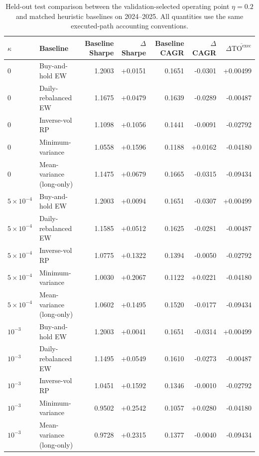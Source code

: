\documentclass[10pt,twocolumn]{article}
\newcommand{\TOexec}{\mathrm{TO}^{\mathrm{exec}}}
\newcommand{\kappaTC}{\kappa}
\begin{document}
\begin{table}[t]
\centering
\scriptsize
\caption{Held-out test comparison between the validation-selected operating point $\eta=0.2$ and matched heuristic baselines on 2024--2025. All quantities use the same executed-path accounting conventions.}
\label{tab:selected_vs_external}
\begin{tabular}{@{}llrrrrr@{}}
\toprule
$\kappaTC$ & Baseline & Baseline Sharpe & $\Delta$Sharpe & Baseline CAGR & $\Delta$CAGR & $\Delta\overline{\TOexec}$ \\
\midrule
$0$ & Buy-and-hold EW & 1.2003 & +0.0151 & 0.1651 & -0.0301 & +0.00499 \\
$0$ & Daily-rebalanced EW & 1.1675 & +0.0479 & 0.1639 & -0.0289 & -0.00487 \\
$0$ & Inverse-vol RP & 1.1098 & +0.1056 & 0.1441 & -0.0091 & -0.02792 \\
$0$ & Minimum-variance & 1.0558 & +0.1596 & 0.1188 & +0.0162 & -0.04180 \\
$0$ & Mean-variance (long-only) & 1.1475 & +0.0679 & 0.1665 & -0.0315 & -0.09434 \\
$5\times10^{-4}$ & Buy-and-hold EW & 1.2003 & +0.0094 & 0.1651 & -0.0307 & +0.00499 \\
$5\times10^{-4}$ & Daily-rebalanced EW & 1.1585 & +0.0512 & 0.1625 & -0.0281 & -0.00487 \\
$5\times10^{-4}$ & Inverse-vol RP & 1.0775 & +0.1322 & 0.1394 & -0.0050 & -0.02792 \\
$5\times10^{-4}$ & Minimum-variance & 1.0030 & +0.2067 & 0.1122 & +0.0221 & -0.04180 \\
$5\times10^{-4}$ & Mean-variance (long-only) & 1.0602 & +0.1495 & 0.1520 & -0.0177 & -0.09434 \\
$10^{-3}$ & Buy-and-hold EW & 1.2003 & +0.0041 & 0.1651 & -0.0314 & +0.00499 \\
$10^{-3}$ & Daily-rebalanced EW & 1.1495 & +0.0549 & 0.1610 & -0.0273 & -0.00487 \\
$10^{-3}$ & Inverse-vol RP & 1.0451 & +0.1592 & 0.1346 & -0.0010 & -0.02792 \\
$10^{-3}$ & Minimum-variance & 0.9502 & +0.2542 & 0.1057 & +0.0280 & -0.04180 \\
$10^{-3}$ & Mean-variance (long-only) & 0.9728 & +0.2315 & 0.1377 & -0.0040 & -0.09434 \\
\bottomrule
\end{tabular}
\end{table}
\end{document}
